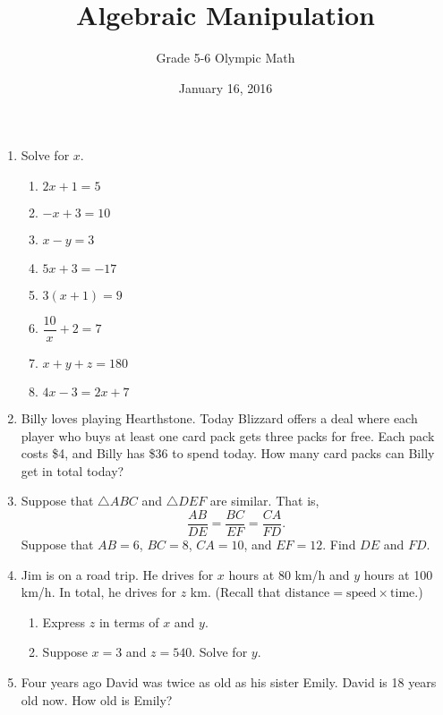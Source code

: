 \documentclass[12pt,letterpaper]{article}
\author{Grade 5-6 Olympic Math}
\title{Algebraic Manipulation}
\date{January 16, 2016}
\begin{document}
	\maketitle
	\begin{enumerate}
		\item Solve for $x$.
		\begin{enumerate}
			\item $2x+1=5$
			\item $-x+3=10$
			\item $x-y=3$
			\item $5x+3=-17$
			\item $3(x+1)=9$
			\item $\dfrac{10}{x}+2=7$\\
			\item $x+y+z=180$
			\item $4x-3=2x+7$
		\end{enumerate}
		
		\item Billy loves playing Hearthstone. Today Blizzard offers a deal where each player who buys at least one card pack gets three packs for free. Each pack costs \$4, and Billy has \$36 to spend today. How many card packs can Billy get in total today?
		
		\item Suppose that $\triangle ABC$ and $\triangle DEF$ are similar. That is,
		\[\frac{AB}{DE}=\frac{BC}{EF}=\frac{CA}{FD}.\]
		Suppose that $AB=6$, $BC=8$, $CA=10$, and $EF=12$. Find $DE$ and $FD$.
		
		\item Jim is on a road trip. He drives for $x$ hours at 80 km/h and $y$ hours at 100 km/h. In total, he drives for $z$ km. (Recall that $\text{distance}=\text{speed}\times\text{time}$.)
		\begin{enumerate}
			\item Express $z$ in terms of $x$ and $y$.
			\item Suppose $x=3$ and $z=540$. Solve for $y$.
		\end{enumerate}
		
		\item Four years ago David was twice as old as his sister Emily. David is 18 years old now. How old is Emily?
	\end{enumerate}
\end{document}
